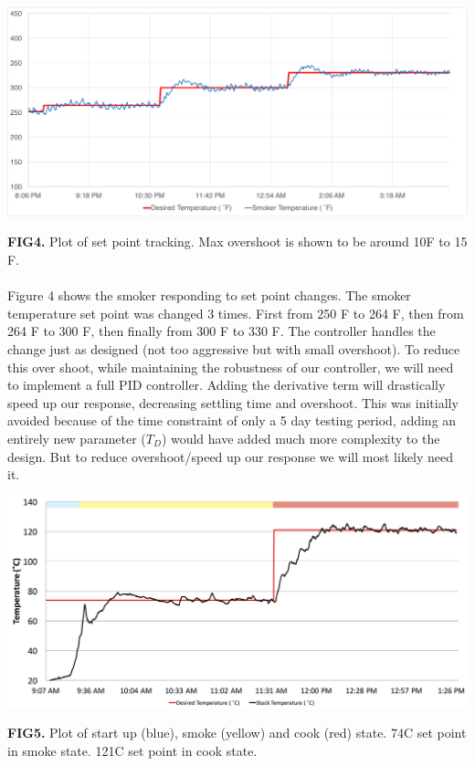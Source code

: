 \documentclass{article}
\begin{document}
\begin{center}
\includegraphics[scale=.37]{responses}
\centering
\end{center}
\textbf{FIG4.} Plot of set point tracking. Max overshoot is shown to be around 10\degree F to 15 \degree F. 
\\\\
Figure 4 shows the smoker responding to set point changes. The smoker temperature set point was changed 3 times. First from 250 \degree F to 264 \degree F, then from 264 \degree F to 300 \degree F, then finally from 300 \degree F to 330 \degree F. The controller handles the change just as designed (not too aggressive but with small overshoot). To reduce this over shoot, while maintaining the robustness of our controller, we will need to implement a full PID controller. Adding the derivative term will drastically speed up our response, decreasing settling time and overshoot. This was initially avoided because of the time constraint of only a 5 day testing period, adding an entirely new parameter ($T_D$) would have added much more complexity to the design. But to reduce overshoot/speed up our response we will most likely need it.
\begin{center}
\includegraphics[scale=.3]{response2}
\centering
\end{center}
\textbf{FIG5.} Plot of start up (blue), smoke (yellow) and cook (red) state. 74\degree C set point in smoke state. 121\degree C set point in cook state.
\end{document}
